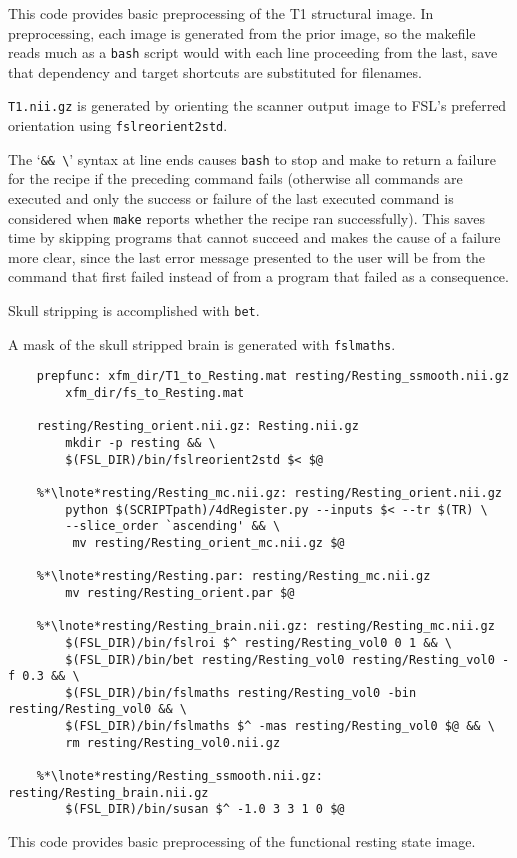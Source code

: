 This code provides basic preprocessing of the T1 structural image. In preprocessing, each image is generated from the prior image, so the makefile reads much as a \texttt{bash} script would with each line proceeding from the last, save that dependency and target shortcuts are substituted for filenames.

\texttt{T1.nii.gz} is generated by orienting the scanner output image to FSL's preferred orientation using \texttt{fslreorient2std}.

The `\texttt{\&\& \textbackslash}' syntax at line ends causes \texttt{bash} to stop and make to return a failure for the recipe if the preceding command fails (otherwise all commands are executed and only the success or failure of the last executed command is considered when \texttt{make} reports whether the recipe ran successfully). This saves time by skipping programs that cannot succeed and makes the cause of a failure more clear, since the last error message presented to the user will be from the command that first failed instead of from a program that failed as a consequence.

Skull stripping is accomplished with \texttt{bet}.

A mask of the skull stripped brain is generated with \texttt{fslmaths}.

\begin{lstlisting}
	prepfunc: xfm_dir/T1_to_Resting.mat resting/Resting_ssmooth.nii.gz 
		xfm_dir/fs_to_Resting.mat
	
	resting/Resting_orient.nii.gz: Resting.nii.gz
		mkdir -p resting && \
		$(FSL_DIR)/bin/fslreorient2std $< $@

	%*\lnote*resting/Resting_mc.nii.gz: resting/Resting_orient.nii.gz
		python $(SCRIPTpath)/4dRegister.py --inputs $< --tr $(TR) \
		--slice_order `ascending' && \
		 mv resting/Resting_orient_mc.nii.gz $@
	
	%*\lnote*resting/Resting.par: resting/Resting_mc.nii.gz
		mv resting/Resting_orient.par $@

	%*\lnote*resting/Resting_brain.nii.gz: resting/Resting_mc.nii.gz
		$(FSL_DIR)/bin/fslroi $^ resting/Resting_vol0 0 1 && \
		$(FSL_DIR)/bin/bet resting/Resting_vol0 resting/Resting_vol0 -f 0.3 && \
		$(FSL_DIR)/bin/fslmaths resting/Resting_vol0 -bin resting/Resting_vol0 && \
		$(FSL_DIR)/bin/fslmaths $^ -mas resting/Resting_vol0 $@ && \
		rm resting/Resting_vol0.nii.gz

	%*\lnote*resting/Resting_ssmooth.nii.gz: resting/Resting_brain.nii.gz
		$(FSL_DIR)/bin/susan $^ -1.0 3 3 1 0 $@	
\end{lstlisting}
This code provides basic preprocessing of the functional resting state image.

